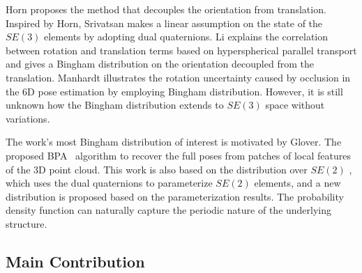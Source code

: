 \documentclass[micromachines,article,accept,pdftex,moreauthors]{Definitions/mdpi}
\begin{document}
Horn \cite{hornClosedformSolutionAbsolute1987} proposes the method that decouples the orientation from translation. Inspired by Horn, Srivatsan \cite{arun2018probabilistic} makes a linear assumption on the state of the {$SE(3)$} %
elements by adopting dual quaternions. Li \cite{liGeometryDrivenStochasticModeling2019} explains the correlation between rotation and translation terms based on hyperspherical parallel transport and gives a {Bingham} distribution on the orientation decoupled from the translation. Manhardt \cite{manhardtExplainingAmbiguityObject2019} illustrates the rotation uncertainty caused by occlusion in the 6D pose estimation by employing {Bingham distribution}. However, it is still unknown how the Bingham distribution extends to {$SE(3)$} %
space without variations.

% 

The work's most Bingham distribution of interest is motivated by Glover. The proposed BPA~\cite{gloverBinghamProcrusteanAlignment2013} algorithm  to recover the full poses from patches of local features of the 3D point cloud. This work is also based on the distribution over {$SE(2)$} %
 \cite{gilitschenskiNewProbabilityDistribution2014}, which uses the dual quaternions to parameterize $SE(2)$ elements, and a new distribution is proposed based on the parameterization results. The probability density function can naturally  capture the periodic nature of the underlying structure.


\subsection*{Main Contribution}
\end{document}
